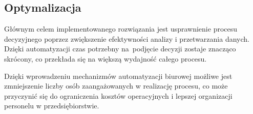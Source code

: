 \subsection{Optymalizacja}
Głównym celem implementowanego rozwiązania jest usprawnienie procesu decyzyjnego poprzez zwiększenie efektywności analizy i przetwarzania danych. Dzięki automatyzacji czas potrzebny na~podjęcie decyzji zostaje znacząco skrócony, co przekłada się na większą wydajność całego procesu.

Dzięki wprowadzeniu mechanizmów automatyzacji biurowej możliwe jest zmniejszenie liczby osób zaangażowanych w realizację procesu, co może przyczynić się do ograniczenia kosztów operacyjnych i lepszej organizacji personelu w przedsiębiorstwie.